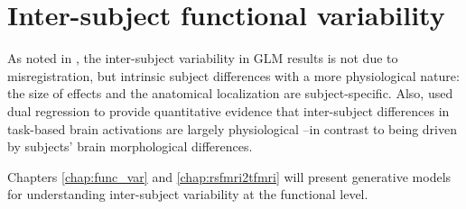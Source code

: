 

\section{Inter-subject functional variability}
As noted in
\citep{thirion2007analysis,pmid22425669,Xu2009}, the inter-subject variability
in GLM results is not due to misregistration, but intrinsic subject
differences with a more physiological nature: the size of effects and
the anatomical localization are subject-specific. Also, \citep{tavor2016task} used
dual regression \citep{Filippini2009} to provide quantitative evidence that inter-subject
differences in task-based brain activations are largely physiological --in contrast to being driven
by subjects' brain morphological differences.

Chapters \ref{chap:func_var} and \ref{chap:rsfmri2tfmri} will present generative models for understanding inter-subject variability at the functional level.


